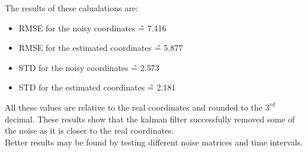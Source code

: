 \documentclass[conference]{IEEEtran}
\begin{document}
        The results of these calualations are:
        \begin{itemize}
            \item RMSE for the noisy coordinates \~= 7.416
            \item RMSE for the estimated coordinates \~= 5.877
            \item STD for the noisy coordinates \~= 2.573
            \item STD for the estimated coordinates \~= 2.181
        \end{itemize}
        All these values are relative to the real coordinates and rounded to the $3^{rd}$ decimal.
        These results show that the kalman filter successfully removed some of the noise as it is closer to the real coordinates.\\ 
        Better results may be found by testing different noise matrices and time intervals.
        

\appendix
\end{document}
